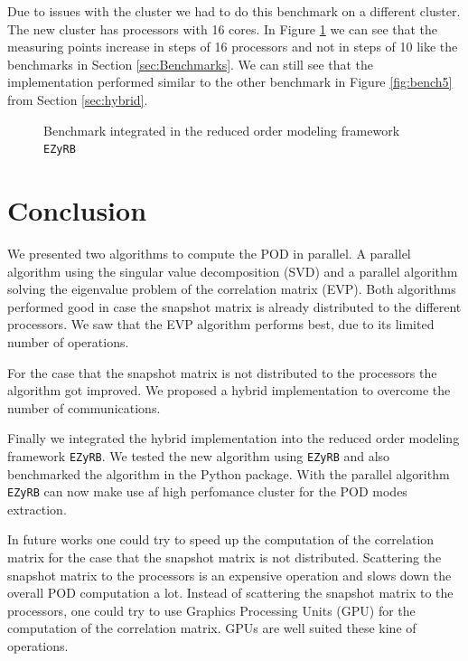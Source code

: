 Due to issues with the cluster we had to do this benchmark on a different cluster. The new cluster has processors with 16 cores.
In Figure \ref{fig:ezybench} we can see that the measuring points increase in steps of 16 processors and not in steps of 10 like the benchmarks in Section \ref{sec:Benchmarks}.
We can still see that the implementation performed similar to the other benchmark in Figure \ref{fig:bench5} from Section \ref{sec:hybrid}.
\begin{figure}[H]
	\centering
	
	\caption[EZyRB Benchmark]{Benchmark integrated in the reduced order modeling framework \texttt{EZyRB}}
	\label{fig:ezybench}
\end{figure}


\newpage
\section{Conclusion}
We presented two algorithms to compute the POD in parallel.
A parallel algorithm using the singular value decomposition (SVD) and a parallel algorithm solving the eigenvalue problem of the correlation matrix (EVP).
Both algorithms performed good in case the snapshot matrix is already distributed to the different processors.
We saw that the EVP algorithm performs best, due to its limited number of operations.

For the case that the snapshot matrix is not distributed to the processors the algorithm got improved.
We proposed a hybrid implementation to overcome the number of communications.

Finally we  integrated the hybrid implementation into the reduced order modeling framework \texttt{EZyRB}.
We tested the new algorithm using \texttt{EZyRB} and also benchmarked the algorithm in the Python package.
With the parallel algorithm \texttt{EZyRB} can now make use af high perfomance cluster for the POD modes extraction.

In future works one could try to speed up the computation of the correlation matrix for the case that the snapshot matrix is not distributed.
Scattering the snapshot matrix to the processors is an expensive operation and slows down the overall POD computation a lot.
Instead of scattering the snapshot matrix to the processors, one could try to use Graphics Processing Units (GPU) for the computation of the correlation matrix.
GPUs are well suited these kine of operations.




